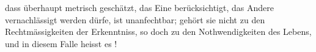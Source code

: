 dass überhaupt metrisch geschätzt, das Eine berücksichtigt, das Andere vernachlässigt werden dürfe, ist unanfechtbar; gehört sie nicht zu den Rechtmässigkeiten der Erkenntniss, so doch zu den Nothwendigkeiten des Lebens, und in diesem Falle heisst es !
\par

